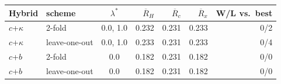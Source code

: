 \setlength{\tabcolsep}{2.6pt}\footnotesize
\begin{tabular}{l l c r r r r}
\toprule
Hybrid & scheme & $\lambda^*$ & $\overline{R}_{H}$ & $\overline{R}_{c}$ & $\overline{R}_{x}$ & W/L vs.\ best\\
\midrule
$c$+$\kappa$ & 2-fold & 0.0, 1.0 & 0.232 & 0.231 & 0.233 & 0/2\\
$c$+$\kappa$ & leave-one-out & 0.0, 1.0 & 0.233 & 0.231 & 0.233 & 0/4\\
$c$+$b$ & 2-fold & 0.0 & 0.182 & 0.231 & 0.182 & 0/0\\
$c$+$b$ & leave-one-out & 0.0 & 0.182 & 0.231 & 0.182 & 0/0\\
\bottomrule
\end{tabular}